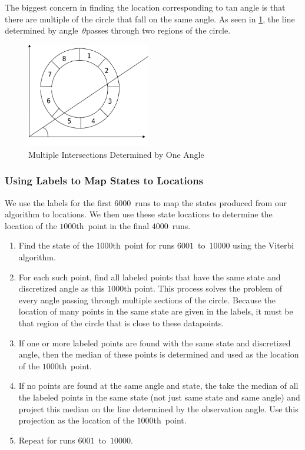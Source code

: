\documentclass[twoside]{article}
\begin{document}
The biggest concern in finding the location corresponding to tan angle is that there are multiple of the circle that fall on the same angle.
As seen in \cref{fig:multi-intersect}, the line determined by angle~$\theta$passes through two regions of the circle.
\begin{figure}
  \begin{center}
    \includegraphics[width=0.48\textwidth]{images/two-intersection}
    \caption[multi-intersect]{Multiple Intersections Determined by One Angle}\label{fig:multi-intersect}
  \end{center}
\end{figure}

\subsubsection{Using Labels to Map States to Locations}\label{sec:using-labels-map}

We use the labels for the first $\num{6000}$~runs to map the states produced from our algorithm to locations.
We then use these state locations to determine the location of the $\num{1000}$th~point in the final $\num{4000}$~runs.
\begin{enumerate}
\item Find the state of the $\num{1000}$th~point for runs $\num{6001}$~to~$\num{10000}$ using the Viterbi algorithm.
\item For each such point, find all labeled points that have the same state and discretized angle as this $\num{1000}$th point.
  This process solves the problem of every angle passing through multiple sections of the circle.
  Because the location of many points in the same state are given in the labels, it must be that region of the circle that is close to these datapoints.
\item If one or more labeled points are found with the same state and discretized angle, then the median of these points is determined and used as the location of the $\num{1000}$th~point.
\item If no points are found at the same angle and state, the take the median of all the labeled points in the same state (not just same state and same angle) and project this median on the line determined by the observation angle.
  Use this projection as the location of the $\num{1000}$th~point.
\item Repeat for runs $\num{6001}$~to~$\num{10000}$.
\end{enumerate}
\end{document}
